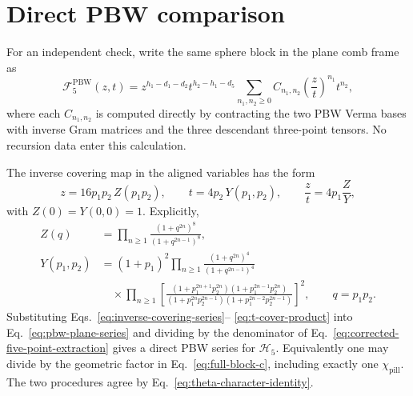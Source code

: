 \documentclass[11pt]{article}
\newcommand{\cF}{\mathcal F}
\newcommand{\cH}{\mathcal H}
\begin{document}
\section{Direct PBW comparison}

For an independent check, write the same sphere block in the plane comb
frame as
\begin{equation}
 \cF^{\mathrm{PBW}}_5(z,t)
 =z^{h_1-d_1-d_2}t^{h_2-h_1-d_5}
 \sum_{n_1,n_2\geq0}C_{n_1,n_2}
 \left(\frac{z}{t}\right)^{n_1}t^{n_2},
 \label{eq:pbw-plane-series}
\end{equation}
where each $C_{n_1,n_2}$ is computed directly by contracting the two PBW
Verma bases with inverse Gram matrices and the three descendant
three-point tensors.  No recursion data enter this calculation.

The inverse covering map in the aligned variables has the form
\begin{equation}
 z=16p_1p_2\,Z(p_1p_2),\qquad
 t=4p_2\,Y(p_1,p_2),\qquad
 \frac{z}{t}=4p_1\frac{Z}{Y},
 \label{eq:inverse-covering-series}
\end{equation}
with $Z(0)=Y(0,0)=1$.  Explicitly,
\begin{align}
 Z(q)
 &=\prod_{n\geq1}
   \frac{(1+q^{2n})^8}{(1+q^{2n-1})^8},
 \label{eq:z-cover-product}\\
 Y(p_1,p_2)
 &=(1+p_1)^2
 \prod_{n\geq1}\frac{(1+q^{2n})^4}{(1+q^{2n-1})^4}
 \nonumber\\
 &\quad\times
 \prod_{n\geq1}
 \left[
 \frac{(1+p_1^{2n+1}p_2^{2n})
       (1+p_1^{2n-1}p_2^{2n})}
      {(1+p_1^{2n}p_2^{2n-1})
       (1+p_1^{2n-2}p_2^{2n-1})}
 \right]^2,
 \qquad q=p_1p_2.
 \label{eq:t-cover-product}
\end{align}
Substituting Eqs.~\eqref{eq:inverse-covering-series}--
\eqref{eq:t-cover-product} into Eq.~\eqref{eq:pbw-plane-series} and dividing
by the denominator of Eq.~\eqref{eq:corrected-five-point-extraction} gives
a direct PBW series for $\cH_5$.  Equivalently one may divide by the
geometric factor in Eq.~\eqref{eq:full-block-c}, including exactly one
$\chi_{\mathrm{pill}}$.  The two procedures agree by
Eq.~\eqref{eq:theta-character-identity}.
\end{document}
